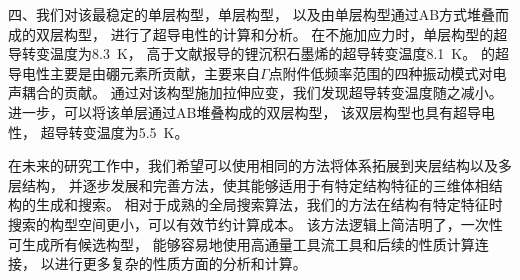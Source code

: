 \documentclass[phd,nobackinfo]{scutthesis}
\begin{document}
\begin{conclusion}
四、我们对该最稳定的单层构型，单层构型，
以及由单层构型通过AB方式堆叠而成的双层构型，
进行了超导电性的计算和分析。
在不施加应力时，单层构型的超导转变温度为\SI{8.3}{\kelvin}，
高于文献报导的锂沉积石墨烯的超导转变温度\SI{8.1}{\kelvin}。
的超导电性主要是由硼元素所贡献，主要来自$\Gamma$点附件低频率范围的四种振动模式对电声耦合的贡献。
通过对该构型施加拉伸应变，我们发现超导转变温度随之减小。
进一步，可以将该单层通过AB堆叠构成的双层构型，
该双层构型也具有超导电性，
超导转变温度为\SI{5.5}{\kelvin}。

在未来的研究工作中，我们希望可以使用相同的方法将体系拓展到夹层结构以及多层结构，
并逐步发展和完善方法，使其能够适用于有特定结构特征的三维体相结构的生成和搜索。
相对于成熟的全局搜索算法，我们的方法在结构有特定特征时搜索的构型空间更小，可以有效节约计算成本。
该方法逻辑上简洁明了，一次性可生成所有候选构型，
能够容易地使用高通量工具流工具和后续的性质计算连接，
以进行更多复杂的性质方面的分析和计算。


\end{conclusion}
\end{document}
